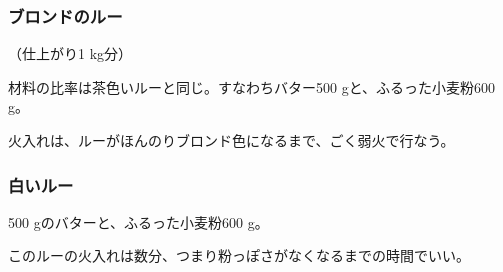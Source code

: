 \begin{recette}
\hypertarget{roux-blond}{%
\subsubsection{ブロンドのルー}\label{roux-blond}}



（仕上がり1 kg分）

材料の比率は茶色いルーと同じ。すなわちバター500 gと、ふるった小麦粉600
g。

火入れは、ルーがほんのりブロンド色になるまで、ごく弱火で行なう。

\hypertarget{roux-blanc}{%
\subsubsection{白いルー}\label{roux-blanc}}


 

500 gのバターと、ふるった小麦粉600 g。

このルーの火入れは数分、つまり粉っぽさがなくなるまでの時間でいい。
\end{recette}